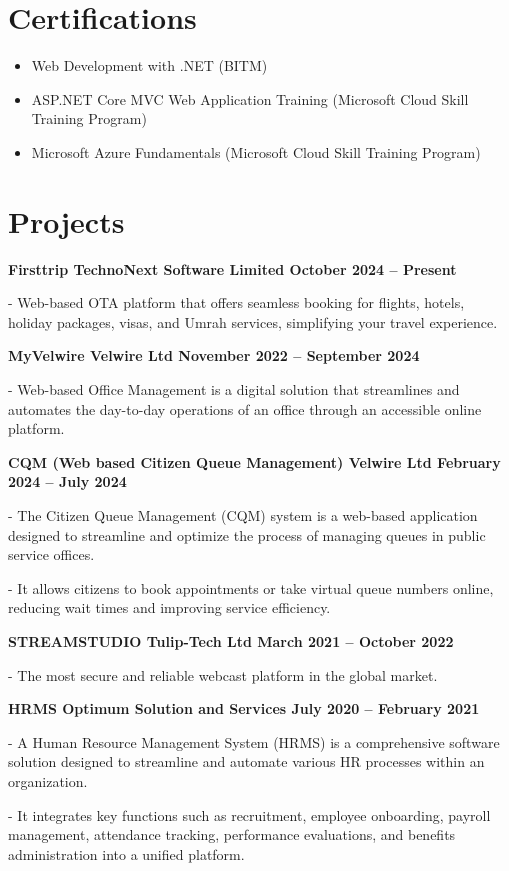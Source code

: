 \documentclass[a4paper,10pt]{article}
\newcommand{\cventry}[2]{%
  \par\vspace{0.7em}%
  \noindent\textbf{#1}\par
  \nopagebreak\vspace{0.2em}%
  \noindent\color{bodygray}#2\par
}
\begin{document}
\section{Certifications}

\begin{itemize}
  \item Web Development with .NET (BITM)
  \item ASP.NET Core MVC Web Application Training (Microsoft Cloud Skill Training Program)
  \item Microsoft Azure Fundamentals (Microsoft Cloud Skill Training Program)
\end{itemize}

\section{Projects}

\cventry{Firsttrip \textbar{} TechnoNext Software Limited \textbar{} October 2024 -- Present}{%
- Web-based OTA platform that offers seamless booking for flights, hotels, holiday
packages, visas, and Umrah services, simplifying your travel experience.}

\cventry{MyVelwire \textbar{} Velwire Ltd \textbar{} November 2022 -- September 2024}{%
- Web-based Office Management is a digital solution that streamlines and automates the
day-to-day operations of an office through an accessible online platform.}

\cventry{CQM (Web based Citizen Queue Management) \textbar{} Velwire Ltd \textbar{} February 2024 -- July 2024}{%
- The Citizen Queue Management (CQM) system is a web-based application designed to
streamline and optimize the process of managing queues in public service offices.\par
\vspace{0.25em}
- It allows citizens to book appointments or take virtual queue numbers online, reducing
wait times and improving service efficiency.}

\cventry{STREAMSTUDIO \textbar{} Tulip-Tech Ltd \textbar{} March 2021 -- October 2022}{%
- The most secure and reliable webcast platform in the global market.}

\cventry{HRMS \textbar{} Optimum Solution and Services \textbar{} July 2020 -- February 2021}{%
- A Human Resource Management System (HRMS) is a comprehensive software solution designed
to streamline and automate various HR processes within an organization.\par
\vspace{0.25em}
- It integrates key functions such as recruitment, employee onboarding, payroll management,
attendance tracking, performance evaluations, and benefits administration into a unified
platform.}
\end{document}
